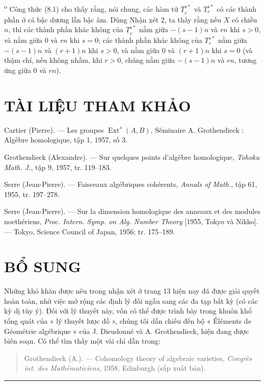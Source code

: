 \medskip
{}\textsuperscript{o} Công thức (8.1) cho thấy rằng, nói chung, các
hàm tử $\underline{T}_{r}^{s*}$ và $T_{r}^{s*}$ có các thành phần ở cả bậc
dương lẫn bậc âm. Dùng Nhận xét 2, ta thấy rằng nếu $X$ có chiều $n$, thì các
thành phần khác không của $\underline{T}_{r}^{s*}$ nằm giữa $-(s-1)n$ và $rn$
khi $s>0$, và nằm giữa $0$ và $rn$ khi $s=0$; các thành phần khác không của
$T_{r}^{s*}$ nằm giữa $-(s-1)n$ và $(r+1)n$ khi $s>0$, và nằm giữa $0$ và
$(r+1)n$ khi $s=0$ (và thậm chí, nếu không nhầm, khi $r>0$, chúng nằm giữa
$-(s-1)n$ và $rn$, tương ứng giữa $0$ và $rn$).

\section*{TÀI LIỆU THAM KHẢO}

\noindent[1] Cartier (Pierre). --- Les groupes
$\operatorname{Ext}^{s}(A,B)$, Séminaire A. Grothendieck : Algèbre homologique,
tập 1, 1957, số 3.

\noindent[2] Grothendieck (Alexandre). --- Sur quelques points d'algèbre
homologique, \emph{Tohoku Math. J.}, tập 9, 1957, tr. 119--183.

\noindent[3] Serre (Jean-Pierre). --- Faisceaux algébriques cohérents,
\emph{Annals of Math.}, tập 61, 1955, tr. 197--278.

\noindent[4] Serre (Jean-Pierre). --- Sur la dimension homologique des anneaux
et des modules noethériens, \emph{Proc. Intern. Symp. on Alg. Number Theory}
[1955, Tokyo và Nikko]. --- Tokyo, Science Council of Japan, 1956;
tr. 175--189.

\clearpage

\section*{BỔ SUNG}

Những khó khăn được nêu trong nhận xét ở trang 13 hiện nay đã được giải quyết
hoàn toàn, nhờ việc mở rộng các định lý đối ngẫu sang các đa tạp bất kỳ
(có các kỳ dị tùy ý). Đối với lý thuyết này, vốn có thể được trình bày trong
khuôn khổ tổng quát của « lý thuyết lược đồ », chúng tôi dẫn chiếu đến bộ
« Éléments de Géométrie algébrique » của J. Dieudonné và A. Grothendieck,
hiện đang được biên soạn. Có thể tìm thấy một vài chỉ dẫn trong:

\begin{quote}
Grothendieck (A.). --- Cohomology theory of algebraic varieties,
\emph{Congrès int. des Mathématiciens}, 1958, Edinburgh (sắp xuất bản).
\end{quote}

\begin{flushright}
\end{flushright}

\begin{center}\rule{36mm}{0.5pt}\end{center}

\par
